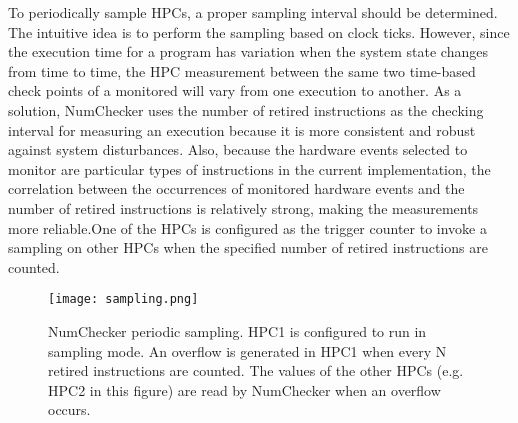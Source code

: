 \documentclass[12pt]{report}
\begin{document}
To periodically sample HPCs, a proper sampling interval
should be determined. The intuitive idea is to perform the
sampling based on clock ticks. However, since the execution
time for a program has variation when the system state changes
from time to time, the HPC measurement between the same
two time-based check points of a monitored will vary from
one execution to another. As a solution, NumChecker uses
the number of retired instructions as the checking interval
for measuring an execution because it is more consistent
and robust against system disturbances. Also, because the
 hardware events selected to monitor are particular types
of instructions in the current implementation, the correlation
between the occurrences of monitored hardware events and
the number of retired instructions is relatively strong, making
the measurements more reliable.One
of the HPCs is configured as the trigger counter to invoke a
sampling on other HPCs when the specified number of retired
instructions are counted.

\begin{figure}[h]
\centering
\texttt{[image: sampling.png]}
\caption{NumChecker periodic sampling. HPC1 is configured to run
in sampling mode. An overflow is generated in HPC1 when every N
retired instructions are counted. The values of the other HPCs (e.g.
HPC2 in this figure) are read by NumChecker when an overflow
occurs.}
\end{figure}
\end{document}
